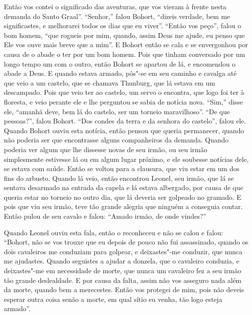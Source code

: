  Então vos contei o significado das aventuras, que vos vieram à frente nesta
demanda do Santo Graal”. “Senhor,” falou Bohort, “dizeis
verdade, bem me significastes, e melhorarei todos os dias que eu viver”. “Então
vos peço”, falou o bom homem, “que rogueis por mim, quando, assim Deus me
ajude, eu penso que Ele vos ouve mais breve que a mim”. E Bohort então se cala
e se envergonhou por causa de o abade o ter por um bom homem. Pois que tinham
conversado por um longo tempo um com o outro, então Bohort se apartou de lá, e
encomendou o abade a Deus. E quando estava armado, pôs"-se em seu caminho e
cavalga até que veio a um castelo, que se chamava Thunburg, que lá estava em um
descampado. Pois que veio ter ao castelo, um servo o encontra, que logo foi ter
à floresta, e veio perante ele e lhe perguntou se sabia de notícia nova. “Sim,”
disse ele, “amanhã deve, bem lá do castelo, ser um torneio maravilhoso”. “De
que pessoas?”, falou Bohort. “Dos condes da terra e da senhora do castelo”,
falou ele. Quando Bohort ouviu esta notícia, então pensou que queria
permanecer, quando não poderia ser que encontrasse alguns companheiros da
demanda. Quando poderia ver algum que lhe dissesse novas de seu irmão, ou seu
irmão simplesmente estivesse lá ou em algum lugar próximo, e ele soubesse
notícias dele, se estava com saúde. Então se voltou para a clausura, que viu
estar em um dos fins do arbusto. Quando lá veio, então encontrou Leonel, seu
irmão, que lá se sentava desarmado na entrada da capela e lá estava albergado,
por causa de que queria estar no torneio no outro dia, que lá deveria ser
golpeado no gramado. E pois que viu seu irmão, teve tão grande alegria que
ninguém a conseguia contar. Então pulou de seu cavalo e falou: “Amado irmão, de
onde vindes?”

Quando Leonel ouviu esta fala, então o reconheceu e não se calou e falou:
“Bohort, não se vos trouxe que eu depois de pouco não fui assassinado, quando
os dois cavaleiros me conduziam para golpear, e deixastes"-me conduzir, que
nunca me ajudastes. Quando seguistes a ajudar a donzela, que o cavaleiro
conduzia, e deixastes"-me em necessidade de morte, que nunca um cavaleiro fez a
seu irmão tão grande deslealdade. E por causa da falta, assim não vos asseguro
nada além da morte, quando bem a merecestes. Então vos protegei de mim, pois
não deveis esperar outra coisa senão a morte, em qual sítio eu venha, tão logo
esteja armado”.


